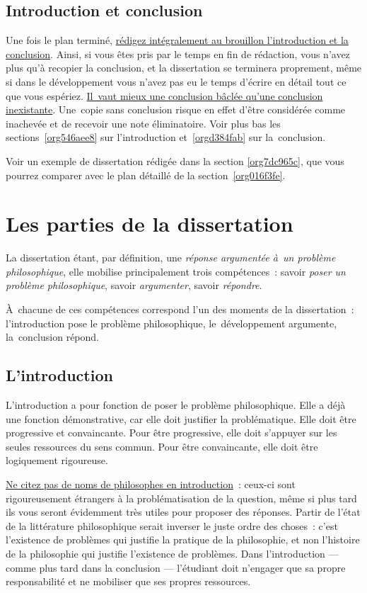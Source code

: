 \documentclass[a4paper,12pt]{report}
\begin{document}
\chapter{Introduction et conclusion}
\label{sec:org9ad7c9d}

Une fois le plan terminé, \uline{rédigez intégralement au brouillon
l'introduction et la conclusion}​. Ainsi, si vous êtes pris par le temps
en fin de rédaction, vous n'avez plus qu'à recopier la conclusion, et la
dissertation se terminera proprement, même si dans le développement vous
n'avez pas eu le temps d'écrire en détail tout ce que vous espériez.
\uline{Il vaut mieux une conclusion bâclée qu'une conclusion inexistante}.
Une copie sans conclusion risque en effet d'être considérée comme
inachevée et de recevoir une note éliminatoire. Voir plus bas les
sections \ref{org546aee8} sur l'introduction et \ref{orgd384fab} sur
la conclusion.

Voir un exemple de dissertation rédigée dans la section \ref{org7dc965c}, que
vous pourrez comparer avec le plan détaillé de la section \ref{org016f3fe}.

\part{Les parties de la dissertation}
\label{sec:org6fec9dd}

La dissertation étant, par définition, une \emph{réponse argumentée à un
problème philosophique}, elle mobilise principalement trois
compétences : savoir \emph{poser un problème philosophique}, savoir
\emph{argumenter}, savoir \emph{répondre}.

À chacune de ces compétences correspond l'un des moments de la
dissertation : l'introduction pose le problème philosophique,
le développement argumente, la conclusion répond.


\chapter{L'introduction}
\label{sec:org82f733d}
\label{org546aee8}

L'introduction a pour fonction de poser le problème philosophique. Elle
a déjà une fonction démonstrative, car elle doit justifier la
problématique. Elle doit être progressive et convaincante. Pour être
progressive, elle doit s'appuyer sur les seules ressources du sens
commun. Pour être convaincante, elle doit être logiquement rigoureuse. 

\uline{Ne citez pas de noms de philosophes en introduction} : ceux-ci sont
rigoureusement étrangers à la problématisation de la question, même si
plus tard ils vous seront évidemment très utiles pour proposer des
réponses. Partir de l'état de la littérature philosophique serait
inverser le juste ordre des choses : c'est l'existence de problèmes qui
justifie la pratique de la philosophie, et non l'histoire de la
philosophie qui justifie l'existence de problèmes. Dans l'introduction
--- comme plus tard dans la conclusion --- l'étudiant doit n'engager que
sa propre responsabilité et ne mobiliser que ses propres ressources.
\end{document}
